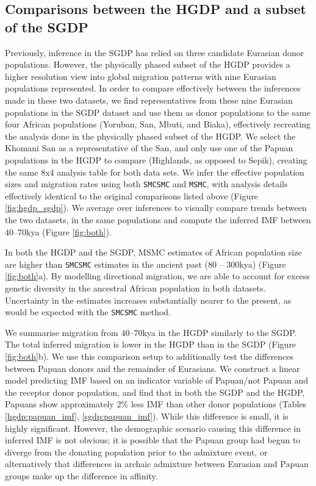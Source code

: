 \subsection{Comparisons between the HGDP and a subset of the SGDP}

Previously, inference in the SGDP has relied on three candidate Eurasian donor populations. However, the physically phased subset of the HGDP provides a higher resolution view into global migration patterns with nine Eurasian populations represented. In order to compare effectively between the inferences made in these two datasets, we find representatives from these nine Eurasian populations in the SGDP dataset and use them as donor populations to the same four African populations (Yoruban, San, Mbuti, and Biaka), effectively recreating the analysis done in the physically phased subset of the HGDP. We select the Khomani San as a representative of the San, and only use one of the Papuan populations in the HGDP to compare (Highlands, as opposed to Sepik), creating the same 8x4 analysis table for both data sets. We infer the effective population sizes and migration rates using both {\tt SMCSMC} and {\tt MSMC}, with analysis details effectively identical to the original comparisons listed above (Figure \ref{fig:hgdp_sgdp}). We average over inferences to visually compare trends between the two datasets, in the same populations and compute the inferred IMF between 40--70kya (Figure \ref{fig:both}).  

In both the HGDP and the SGDP, MSMC estimates of African population size are higher than {\tt SMCSMC} estimates in the ancient past (80 -- 300kya) (Figure \ref{fig:both}a). By modelling directional migration, we are able to account for excess genetic diversity in the ancestral African population in both datasets. Uncertainty in the estimates increases substantially nearer to the present, as would be expected with the {\tt SMCSMC} method. 

We summarise migration from 40--70kya in the HGDP similarly to the SGDP. The total inferred migration is lower in the HGDP than in the SGDP (Figure \ref{fig:both}b). We use this comparison setup to additionally test the differences between Papuan donors and the remainder of Eurasians. We construct a linear model predicting IMF based on an indicator variable of Papuan/not Papuan and the receptor donor population, and find that in both the SGDP and the HGDP, Papuans show approximately 2\% less IMF than other donor populations (Tables \ref{hgdp:papuan_imf}, \ref{sgdp:papuan_imf}). While this difference is small, it is highly significant. However, the demographic scenario causing this difference in inferred IMF is not obvious; it is possible that the Papuan group had begun to diverge from the donating population prior to the admixture event, or alternatively that differences in archaic admixture between Eurasian and Papuan groups make up the difference in affinity. 



